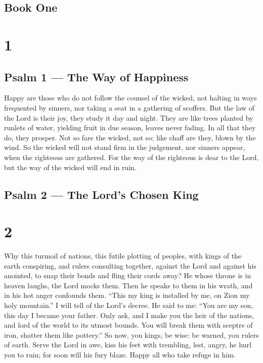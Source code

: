 \hypertarget{book-one}{%
\subsection{Book One}\label{book-one}}

\hypertarget{section}{%
\section{1}\label{section}}

\hypertarget{psalm-1-the-way-of-happiness}{%
\subsection{Psalm 1 --- The Way of
Happiness}\label{psalm-1-the-way-of-happiness}}

 Happy are those who do not follow the counsel of the
wicked, not halting in ways frequented by sinners, nor taking a seat in
a gathering of scoffers.  But the law of the Lord is their
joy, they study it day and night.  They are like trees
planted by runlets of water, yielding fruit in due season, leaves never
fading. In all that they do, they prosper.  Not so fare the
wicked, not so; like chaff are they, blown by the wind.  So
the wicked will not stand firm in the judgement, nor sinners appear,
when the righteous are gathered.  For the way of the
righteous is dear to the Lord, but the way of the wicked will end in
ruin.

\hypertarget{psalm-2-the-lords-chosen-king}{%
\subsection{Psalm 2 --- The Lord's Chosen
King}\label{psalm-2-the-lords-chosen-king}}

\hypertarget{section-1}{%
\section{2}\label{section-1}}

 Why this turmoil of nations, this futile plotting of
peoples,  with kings of the earth conspiring, and rulers
consulting together, against the Lord and against his anointed,
 to snap their bonds and fling their cords away?
 He whose throne is in heaven laughs, the Lord mocks them.
 Then he speaks to them in his wrath, and in his hot anger
confounds them.  ``This my king is installed by me, on Zion
my holy mountain.''  I will tell of the Lord's decree. He
said to me: ``You are my son, this day I became your father.
 Only ask, and I make you the heir of the nations, and lord
of the world to its utmost bounds.  You will break them with
sceptre of iron, shatter them like pottery.''  So now, you
kings, be wise: be warned, you rulers of earth.  Serve the
Lord in awe, kiss his feet with trembling,  lest, angry, he
hurl you to ruin; for soon will his fury blaze. Happy all who take
refuge in him.

